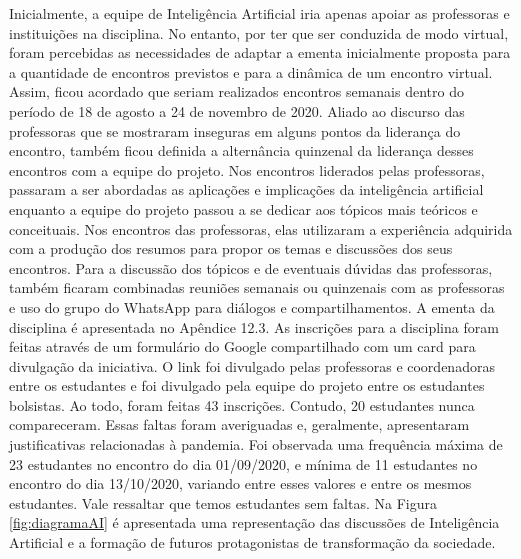 \documentclass[
]{book}
\begin{document}
Inicialmente, a equipe de Inteligência Artificial iria apenas apoiar as professoras e instituições na disciplina. No entanto, por ter que ser conduzida de modo virtual, foram percebidas as necessidades de adaptar a ementa inicialmente proposta para a quantidade de encontros previstos e para a dinâmica de um encontro virtual. Assim, ficou acordado que seriam realizados encontros semanais dentro do período de 18 de agosto a 24 de novembro de 2020. Aliado ao discurso das professoras que se mostraram inseguras em alguns pontos da liderança do encontro, também ficou definida a alternância quinzenal da liderança desses encontros com a equipe do projeto. Nos encontros liderados pelas professoras, passaram a ser abordadas as aplicações e implicações da inteligência artificial enquanto a equipe do projeto passou a se dedicar aos tópicos mais teóricos e conceituais. Nos encontros das professoras, elas utilizaram a experiência adquirida com a produção dos resumos para propor os temas e discussões dos seus encontros. Para a discussão dos tópicos e de eventuais dúvidas das professoras, também ficaram combinadas reuniões semanais ou quinzenais com as professoras e uso do grupo do WhatsApp para diálogos e compartilhamentos. A ementa da disciplina é apresentada no Apêndice 12.3.
As inscrições para a disciplina foram feitas através de um formulário do Google compartilhado com um card para divulgação da iniciativa. O link foi divulgado pelas professoras e coordenadoras entre os estudantes e foi divulgado pela equipe do projeto entre os estudantes bolsistas.
Ao todo, foram feitas 43 inscrições. Contudo, 20 estudantes nunca compareceram. Essas faltas foram averiguadas e, geralmente, apresentaram justificativas relacionadas à pandemia. Foi observada uma frequência máxima de 23 estudantes no encontro do dia 01/09/2020, e mínima de 11 estudantes no encontro do dia 13/10/2020, variando entre esses valores e entre os mesmos estudantes. Vale ressaltar que temos estudantes sem faltas.
Na Figura \ref{fig:diagramaAI} é apresentada uma representação das discussões de Inteligência Artificial e a formação de futuros protagonistas de transformação da sociedade.
\end{document}
